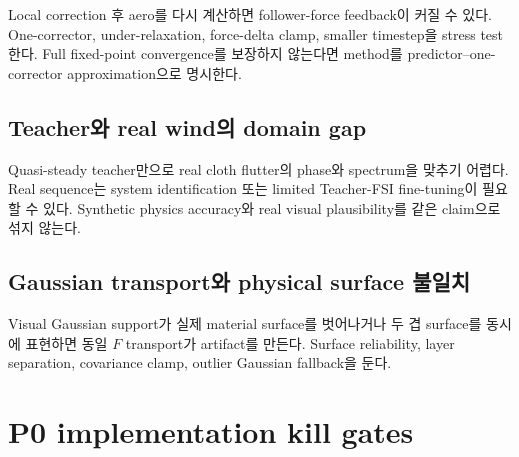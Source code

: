 \documentclass[11pt,a4paper]{article}
\begin{document}
Local correction 후 aero를 다시 계산하면 follower-force feedback이 커질 수 있다.
One-corrector, under-relaxation, force-delta clamp,
smaller timestep을 stress test한다.
Full fixed-point convergence를 보장하지 않는다면
method를 predictor--one-corrector approximation으로 명시한다.

\subsection{Teacher와 real wind의 domain gap}

Quasi-steady teacher만으로 real cloth flutter의 phase와 spectrum을 맞추기 어렵다.
Real sequence는 system identification 또는 limited Teacher-FSI fine-tuning이 필요할 수 있다.
Synthetic physics accuracy와 real visual plausibility를 같은 claim으로 섞지 않는다.

\subsection{Gaussian transport와 physical surface 불일치}

Visual Gaussian support가 실제 material surface를 벗어나거나
두 겹 surface를 동시에 표현하면 동일 \(F\) transport가 artifact를 만든다.
Surface reliability, layer separation, covariance clamp,
outlier Gaussian fallback을 둔다.

\section{P0 implementation kill gates}
\end{document}
